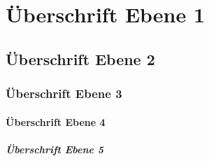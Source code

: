 \documentclass{article}
\begin{document}
  \section{Überschrift Ebene 1}
  \subsection{Überschrift Ebene 2}
  \subsubsection{Überschrift Ebene 3}
  \paragraph{Überschrift Ebene 4}
  \subparagraph{Überschrift Ebene 5}
\end{document}
